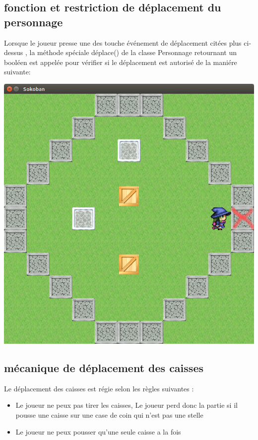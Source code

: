 \documentclass{article}
\begin{document}
		\subsection{fonction et restriction de déplacement du personnage}		
		Lorsque le joueur presse une des touche événement de déplacement citées plus ci-dessus , la méthode spéciale déplace() de la classe Personnage retournant un booléen est appelée pour vérifier si le déplacement est autorisé de la maniére suivante:
	\vspace{0.5cm}
	\begin{center}

			\includegraphics[scale=0.25]{../Screenshots/01.png}
				
	\end{center}
		\subsection{mécanique de déplacement des caisses}
			Le déplacement des caisses est régie selon les règles suivantes : 
			\begin{itemize}
				
				\item Le joueur ne peux pas tirer les caisses, Le joueur perd donc la partie si il pousse une caisse sur une case de coin qui n'est pas une stelle
				\item Le joueur ne peux pousser qu'une seule caisse a la fois 
				
				\end{itemize}
				
\end{document}
